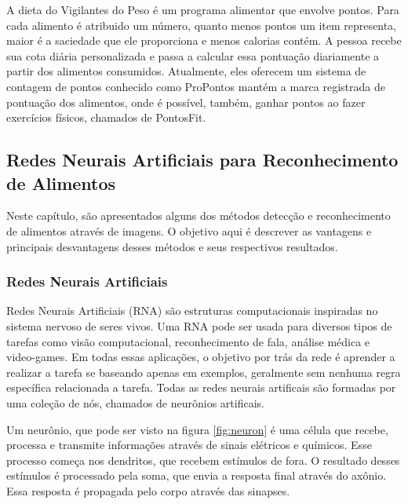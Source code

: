 A dieta do Vigilantes do Peso \cite{vigilantes_do_peso} é um programa alimentar que envolve pontos. Para cada alimento é atribuido um número, quanto menos pontos um item representa, maior é a saciedade que ele proporciona e menos calorias contém. A pessoa recebe sua cota diária personalizada e passa a calcular essa pontuação diariamente a partir dos alimentos consumidos. Atualmente, eles oferecem um sistema de contagem de pontos conhecido como ProPontos mantém a marca registrada de pontuação dos alimentos, onde é possível, também, ganhar pontos ao fazer exercícios físicos, chamados de PontosFit.

\newpage


\subsection{Redes Neurais Artificiais para Reconhecimento de Alimentos} \label{subsec:nn}

Neste capítulo, são apresentados alguns dos métodos detecção e reconhecimento de alimentos através de imagens. O objetivo aqui é descrever as vantagens e principais desvantagens desses métodos e seus respectivos resultados. 

\subsubsection{Redes Neurais Artificiais\label{subsubsec:ann}}

Redes Neurais Artificiais (RNA) são estruturas computacionais inspiradas no sistema nervoso de seres vivos. Uma RNA pode ser usada para diversos tipos de tarefas como visão computacional, reconhecimento de fala, análise médica e video-games. Em todas essas aplicações, o objetivo por trás da rede é aprender a realizar a tarefa se baseando apenas em exemplos, geralmente sem nenhuma regra específica relacionada a tarefa. Todas as redes neurais artificais são formadas por uma coleção de nós, chamados de neurônios artificais.


Um neurônio, que pode ser visto na figura \ref{fig:neuron} é uma célula que recebe, processa e transmite informações através de sinais elétricos e químicos. Esse processo começa nos dendritos, que recebem estímulos de fora. O resultado desses estímulos é processado pela soma, que envia a resposta final através do axônio. Essa resposta é propagada pelo corpo através das sinapses.

